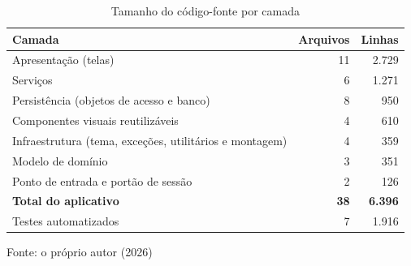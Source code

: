\begin{table}[!ht]
    \centering
    \caption{Tamanho do código-fonte por camada}
    \label{tab:metricas-codigo}
    \begin{tabular}{p{15cm}rr}
        \hline
        \textbf{Camada} & \textbf{Arquivos} & \textbf{Linhas} \\
        \hline
        Apresentação (telas) & 11 & 2.729 \\
        Serviços & 6 & 1.271 \\
        Persistência (objetos de acesso e banco) & 8 & 950 \\
        Componentes visuais reutilizáveis & 4 & 610 \\
        Infraestrutura (tema, exceções, utilitários e montagem) & 4 & 359 \\
        Modelo de domínio & 3 & 351 \\
        Ponto de entrada e portão de sessão & 2 & 126 \\
        \hline
        \textbf{Total do aplicativo} & \textbf{38} & \textbf{6.396} \\
        \hline
        Testes automatizados & 7 & 1.916 \\
        \hline
    \end{tabular}
    \vspace{2pt}
    \footnotesize Fonte: o próprio autor (2026)
\end{table}
